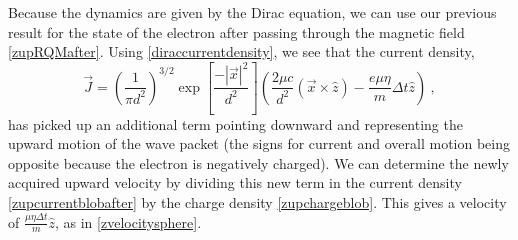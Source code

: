 \documentclass[12pt,secnumarabic,amsmath,amssymb,balancelastpage,nofootinbib]{article}
\begin{document}
Because the dynamics are given by the Dirac equation, we can use our previous result for the state of the electron after passing through the magnetic field \eqref{zupRQMafter}.  Using \eqref{diraccurrentdensity}, we see that the current density,
\begin{equation}
\vec{J}=\left(\frac{1}{\pi d^2}\right)^{3/2} \exp\left[\frac{-|\vec{x}|^2}{d^2}\right]\left( \frac{2\mu c}{d^2} (\vec{x} \times \hat{z}) - \frac{e \mu \eta}{m}\Delta t \hat{z} \right)
\ ,
\label{zupcurrentblobafter}
\end{equation}
has picked up an additional term pointing downward and representing the upward motion of the wave packet (the signs for current and overall motion being opposite because the electron is negatively charged).  We can determine the newly acquired upward velocity by dividing this new term in the current density \eqref{zupcurrentblobafter} by the charge density \eqref{zupchargeblob}.  This gives a velocity of $\frac{\mu \eta \Delta t}{m} \hat{z}$, as in \eqref{zvelocitysphere}.
\end{document}
